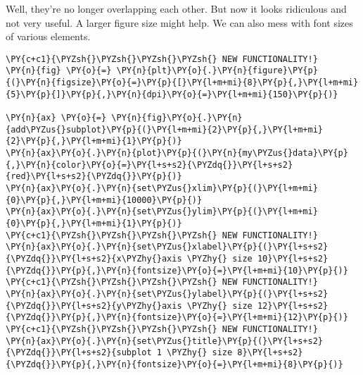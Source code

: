     Well, they're no longer overlapping each other. But now it looks
ridiculous and not very useful. A larger figure size might help. We can
also mess with font sizes of various elements.

    \begin{tcolorbox}[breakable, size=fbox, boxrule=1pt, pad at break*=1mm,colback=cellbackground, colframe=cellborder]
\begin{Verbatim}[commandchars=\\\{\}]
\PY{c+c1}{\PYZsh{}\PYZsh{}\PYZsh{}\PYZsh{} NEW FUNCTIONALITY!}
\PY{n}{fig} \PY{o}{=} \PY{n}{plt}\PY{o}{.}\PY{n}{figure}\PY{p}{(}\PY{n}{figsize}\PY{o}{=}\PY{p}{[}\PY{l+m+mi}{8}\PY{p}{,}\PY{l+m+mi}{5}\PY{p}{]}\PY{p}{,}\PY{n}{dpi}\PY{o}{=}\PY{l+m+mi}{150}\PY{p}{)} 

\PY{n}{ax} \PY{o}{=} \PY{n}{fig}\PY{o}{.}\PY{n}{add\PYZus{}subplot}\PY{p}{(}\PY{l+m+mi}{2}\PY{p}{,}\PY{l+m+mi}{2}\PY{p}{,}\PY{l+m+mi}{1}\PY{p}{)}
\PY{n}{ax}\PY{o}{.}\PY{n}{plot}\PY{p}{(}\PY{n}{my\PYZus{}data}\PY{p}{,}\PY{n}{color}\PY{o}{=}\PY{l+s+s2}{\PYZdq{}}\PY{l+s+s2}{red}\PY{l+s+s2}{\PYZdq{}}\PY{p}{)}
\PY{n}{ax}\PY{o}{.}\PY{n}{set\PYZus{}xlim}\PY{p}{(}\PY{l+m+mi}{0}\PY{p}{,}\PY{l+m+mi}{10000}\PY{p}{)}
\PY{n}{ax}\PY{o}{.}\PY{n}{set\PYZus{}ylim}\PY{p}{(}\PY{l+m+mi}{0}\PY{p}{,}\PY{l+m+mi}{1}\PY{p}{)}
\PY{c+c1}{\PYZsh{}\PYZsh{}\PYZsh{}\PYZsh{} NEW FUNCTIONALITY!}
\PY{n}{ax}\PY{o}{.}\PY{n}{set\PYZus{}xlabel}\PY{p}{(}\PY{l+s+s2}{\PYZdq{}}\PY{l+s+s2}{x\PYZhy{}axis \PYZhy{} size 10}\PY{l+s+s2}{\PYZdq{}}\PY{p}{,}\PY{n}{fontsize}\PY{o}{=}\PY{l+m+mi}{10}\PY{p}{)}
\PY{c+c1}{\PYZsh{}\PYZsh{}\PYZsh{}\PYZsh{} NEW FUNCTIONALITY!}
\PY{n}{ax}\PY{o}{.}\PY{n}{set\PYZus{}ylabel}\PY{p}{(}\PY{l+s+s2}{\PYZdq{}}\PY{l+s+s2}{y\PYZhy{}axis \PYZhy{} size 12}\PY{l+s+s2}{\PYZdq{}}\PY{p}{,}\PY{n}{fontsize}\PY{o}{=}\PY{l+m+mi}{12}\PY{p}{)}
\PY{c+c1}{\PYZsh{}\PYZsh{}\PYZsh{}\PYZsh{} NEW FUNCTIONALITY!}
\PY{n}{ax}\PY{o}{.}\PY{n}{set\PYZus{}title}\PY{p}{(}\PY{l+s+s2}{\PYZdq{}}\PY{l+s+s2}{subplot 1 \PYZhy{} size 8}\PY{l+s+s2}{\PYZdq{}}\PY{p}{,}\PY{n}{fontsize}\PY{o}{=}\PY{l+m+mi}{8}\PY{p}{)}


\end{Verbatim}
\end{tcolorbox}
